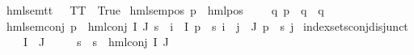 \begin{isabellebody}
\isanewline
hml{\isacharunderscore}{\kern0pt}sem{\isacharunderscore}{\kern0pt}tt{\isacharcolon}{\kern0pt}\ {\isacartoucheopen}{\isacharparenleft}{\kern0pt}{\isacharunderscore}{\kern0pt}\ {\isasymTurnstile}\ TT{\isacharparenright}{\kern0pt}\ {\isacharequal}{\kern0pt}\ True{\isacartoucheclose}\ {\isacharbar}{\kern0pt}\isanewline
hml{\isacharunderscore}{\kern0pt}sem{\isacharunderscore}{\kern0pt}pos{\isacharcolon}{\kern0pt}\ {\isacartoucheopen}{\isacharparenleft}{\kern0pt}p\ {\isasymTurnstile}\ {\isacharparenleft}{\kern0pt}hml{\isacharunderscore}{\kern0pt}pos\ {\isasymalpha}\ {\isasymphi}{\isacharparenright}{\kern0pt}{\isacharparenright}{\kern0pt}\ {\isacharequal}{\kern0pt}\ {\isacharparenleft}{\kern0pt}{\isasymexists}\ q{\isachardot}{\kern0pt}\ {\isacharparenleft}{\kern0pt}p\ {\isasymmapsto}{\isasymalpha}\ q{\isacharparenright}{\kern0pt}\ {\isasymand}\ q\ {\isasymTurnstile}\ {\isasymphi}{\isacharparenright}{\kern0pt}{\isacartoucheclose}\ {\isacharbar}{\kern0pt}\isanewline
hml{\isacharunderscore}{\kern0pt}sem{\isacharunderscore}{\kern0pt}conj{\isacharcolon}{\kern0pt}\ {\isacartoucheopen}{\isacharparenleft}{\kern0pt}p\ {\isasymTurnstile}\ {\isacharparenleft}{\kern0pt}hml{\isacharunderscore}{\kern0pt}conj\ I\ J\ {\isasympsi}s{\isacharparenright}{\kern0pt}{\isacharparenright}{\kern0pt}\ {\isacharequal}{\kern0pt}\ {\isacharparenleft}{\kern0pt}{\isacharparenleft}{\kern0pt}{\isasymforall}i\ {\isasymin}\ I{\isachardot}{\kern0pt}\ p\ {\isasymTurnstile}\ {\isacharparenleft}{\kern0pt}{\isasympsi}s\ i{\isacharparenright}{\kern0pt}{\isacharparenright}{\kern0pt}\ {\isasymand}\ {\isacharparenleft}{\kern0pt}{\isasymforall}j\ {\isasymin}\ J{\isachardot}{\kern0pt}\ {\isasymnot}{\isacharparenleft}{\kern0pt}p\ {\isasymTurnstile}\ {\isacharparenleft}{\kern0pt}{\isasympsi}s\ j{\isacharparenright}{\kern0pt}{\isacharparenright}{\kern0pt}{\isacharparenright}{\kern0pt}{\isacharparenright}{\kern0pt}{\isacartoucheclose}\isanewline
\isanewline
{}\isamarkupfalse%
\ index{\isacharunderscore}{\kern0pt}sets{\isacharunderscore}{\kern0pt}conj{\isacharunderscore}{\kern0pt}disjunct{\isacharcolon}{\kern0pt}\isanewline
\ \ \ {\isachardoublequoteopen}I\ {\isasyminter}\ J\ {\isasymnoteq}\ {\isacharbraceleft}{\kern0pt}{\isacharbraceright}{\kern0pt}{\isachardoublequoteclose}\isanewline
\ \ \ {\isachardoublequoteopen}{\isasymforall}s{\isachardot}{\kern0pt}\ {\isasymnot}\ {\isacharparenleft}{\kern0pt}s\ {\isasymTurnstile}\ {\isacharparenleft}{\kern0pt}hml{\isacharunderscore}{\kern0pt}conj\ I\ J\ {\isasymPhi}{\isacharparenright}{\kern0pt}{\isacharparenright}{\kern0pt}{\isachardoublequoteclose}\isanewline

\end{isabellebody}
